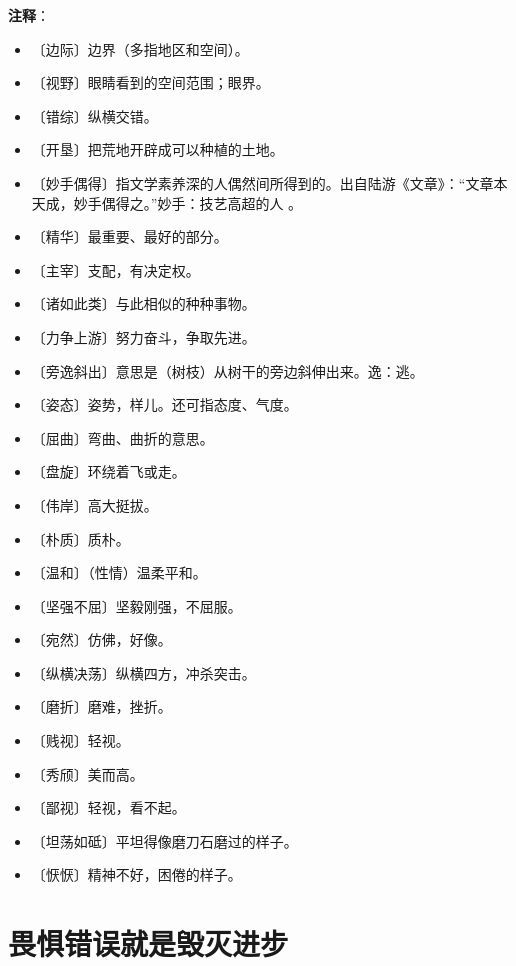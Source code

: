 \documentclass[12pt,UTF-8,openany]{ctexbook}
\begin{document}
\newpage

\textbf{注释}：

\vspace{-1em}

\begin{itemize}
    \setlength\itemsep{-0.2em}
    \item 〔边际〕边界（多指地区和空间）。
    \item 〔视野〕眼睛看到的空间范围；眼界。
    \item 〔错综〕纵横交错。
    \item 〔开垦〕把荒地开辟成可以种植的土地。
    \item 〔妙手偶得〕指文学素养深的人偶然间所得到的。出自陆游《文章》：“文章本天成，妙手偶得之。”妙手：技艺高超的人 。
    \item 〔精华〕最重要、最好的部分。
    \item 〔主宰〕支配，有决定权。
    \item 〔诸如此类〕与此相似的种种事物。
    \item 〔力争上游〕努力奋斗，争取先进。
    \item 〔旁逸斜出〕意思是（树枝）从树干的旁边斜伸出来。逸：逃。
    \item 〔姿态〕姿势，样儿。还可指态度、气度。
    \item 〔屈曲〕弯曲、曲折的意思。
    \item 〔盘旋〕环绕着飞或走。
    \item 〔伟岸〕高大挺拔。
    \item 〔朴质〕质朴。
    \item 〔温和〕（性情）温柔平和。
    \item 〔坚强不屈〕坚毅刚强，不屈服。
    \item 〔宛然〕仿佛，好像。
    \item 〔纵横决荡〕纵横四方，冲杀突击。
    \item 〔磨折〕磨难，挫折。
    \item 〔贱视〕轻视。
    \item 〔秀颀〕美而高。
    \item 〔鄙视〕轻视，看不起。
    \item 〔坦荡如砥〕平坦得像磨刀石磨过的样子。
    \item 〔恹恹〕精神不好，困倦的样子。
\end{itemize}

\chapter{畏惧错误就是毁灭进步}
\end{document}
